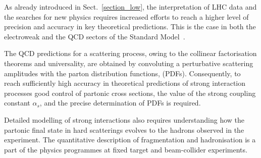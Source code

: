 
As already introduced    in Sect.~\ref{section_low}, the  interpretation  of LHC data and the searches for new physics 
requires increased efforts to reach a higher level of precision and accuracy in key
theoretical predictions.
 This is the case in both the electroweak and the
   QCD  sectors of the Standard Model~\cite{Azzi:2019yne,Citron:2018lsq}.

The  QCD predictions for a scattering process,  owing to  the collinear factorisation theorems and universality,  are obtained by convoluting a perturbative 
scattering amplitudes        with the 
parton distribution functions,  (PDFs). Consequently, to reach sufficiently  high   accuracy in theoretical predictions  of strong interaction processes  good control of     partonic   cross sections,  the value of the  strong coupling constant $\alpha_s$,  and  the    precise determination of PDFs is required.

Detailed modelling of strong interactions also requires understanding how the partonic final state in hard scatterings evolves to the hadrons observed in the experiment. The quantitative description of  fragmentation and  hadronisation  is a part of the physics programmes at  fixed target and beam-collider experiments.

